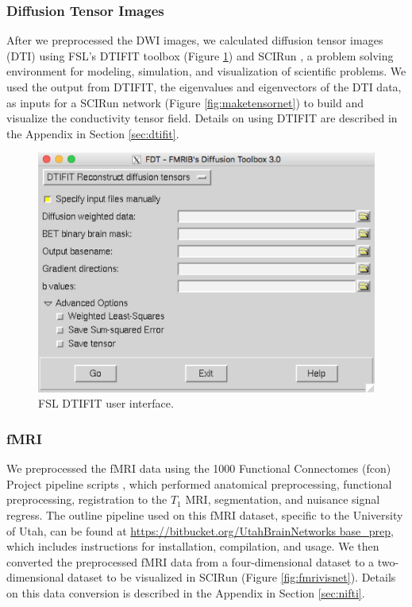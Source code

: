 \subsubsection{Diffusion Tensor Images}

After we preprocessed the DWI images, we calculated diffusion tensor images (DTI) using FSL's DTIFIT toolbox \cite{ref:dtifit} (Figure \ref{fig:dtifit}) and SCIRun \cite{ref:scirun}, a problem solving environment for modeling, simulation, and visualization of scientific problems. We used the output from DTIFIT, the eigenvalues and eigenvectors of the DTI data, as inputs for a SCIRun network (Figure \ref{fig:maketensornet}) to build and visualize the conductivity tensor field. Details on using DTIFIT are described in the Appendix in Section \ref{sec:dtifit}.

\begin{figure}[H]
    \centering
    \includegraphics[width=.8\textwidth]{Figures/DTIFIT}
    \caption{FSL DTIFIT user interface.}
    \label{fig:dtifit}
\end{figure}

\subsubsection{fMRI}
\label{sec:fmripre}

We preprocessed the fMRI data using the 1000 Functional Connectomes (fcon) Project pipeline scripts \cite{ref:fcon}, which performed anatomical preprocessing, functional preprocessing, registration to the $T_1$ MRI, segmentation, and nuisance signal regress. The outline pipeline used on this fMRI dataset, specific to the University of Utah, can be found at \url{https://bitbucket.org/UtahBrainNetworks base_prep}, which includes instructions for installation, compilation, and usage. We then converted the preprocessed fMRI data from a four-dimensional dataset to a two-dimensional dataset to be visualized in SCIRun (Figure \ref{fig:fmrivisnet}). Details on this data conversion is described in the Appendix in Section \ref{sec:nifti}. 

